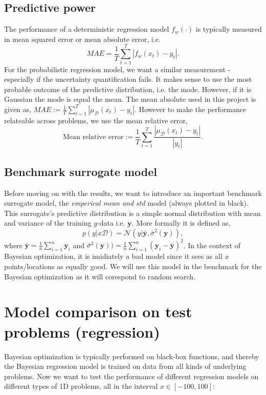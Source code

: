 \subsection{Predictive power}
The performance of a deterministic regression model $f_w(\cdot)$ is typically measured in mean squared error or 
mean absolute error, i.e. 
$$MAE = \frac{1}{T}\sum_{t=1}^T |f_{w}(x_t) - y_t|.$$ For the probabilistic regression model, we
want a similar measurement - especially if the uncertainty quantification fails. It makes sense to use
the most probable outcome of the predictive distribution, i.e. the mode. However, if it is Gaussian
the mode is equal the mean. The mean absolute used in this project is given as, 
$MAE :=\frac{1}{T}\sum_{t=1}^T |\mu_{\mathcal{D}}(x_t) - y_t|.$ However to make the performance
relateable across problems, we use the mean relative error, 
$$\text{Mean relative error} :=\frac{1}{T}\sum_{t=1}^T \frac{|\mu_{\mathcal{D}}(x_t) - y_t|}{|y_t|}.$$

\subsection{Benchmark surrogate model}
Before moving on with the results, we want to introduce an important benchmark surrogate model, the
\textit{emperical mean and std} model (always plotted in black). This surrogate's predictive distribution
is a simple normal distribution with mean and variance of the training $y$-data i.e. $\textbf{y}$. More
formally it is defined as, 
$$p(y|x\mathcal{D}) = \mathcal{N}(y| \bar{\textbf{y}} , \bar{\sigma}^2 (\textbf{y})),$$ where
$\bar{\textbf{y}} = \frac{1}{n}\sum_{i=1}^n \textbf{y}_i $ and $\bar{\sigma}^2 (\textbf{y})) =
\frac{1}{n}\sum_{i=1}^n (\textbf{y}_i-\bar{\textbf{y}})^2$. In the context of Bayesian optimization,
it is imidiately a bad model since it sees as all $x$ points/locations as equally good. We will use
this model in the benchmark for the Bayesian optimization as it will corespond to random search. 
 
\section{Model comparison on test problems (regression)}
Bayesian optimization is typically performed on black-box functions, and thereby the Bayesian
regression model is trained on data from all kinds of underlying problems. Now we want to test the
performance of different regression models on different types of 1D problems, all in the interval $x
\in [-100,100]$:


